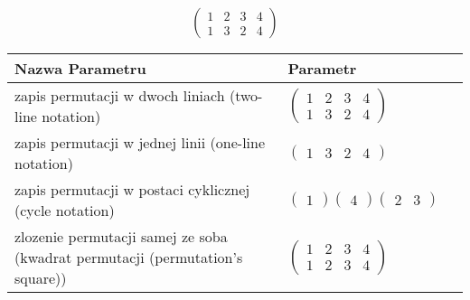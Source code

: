 \documentclass[12pt]{article}
\begin{document}
\subsection{}
\begin{center}
\[
\begin{pmatrix}
	1 & 2 & 3 & 4 \\ 
	1 & 3 & 2 & 4 
\end{pmatrix}
\]

\begin{tabular}{|m{0.6\linewidth}|m{0.4\linewidth}|}
	\hline
	Nazwa Parametru & Parametr \\
	\hline
	zapis permutacji w dwoch liniach (two-line notation) & $\begin{pmatrix} 1 & 2 & 3 & 4 \\ 
1 & 3 & 2 & 4 \end{pmatrix}$ \\ 
	\hline
	zapis permutacji w jednej linii (one-line notation) & $\begin{pmatrix} 1 & 3 & 2 & 4 \end{pmatrix}$ \\ 
	\hline
	zapis permutacji w postaci cyklicznej (cycle notation) & $\begin{pmatrix} 1 \end{pmatrix} \begin{pmatrix} 4 \end{pmatrix} \begin{pmatrix} 2 & 3 \end{pmatrix} $ \\ 
	\hline
	zlozenie permutacji samej ze soba (kwadrat permutacji (permutation's square)) & $\begin{pmatrix} 1 & 2 & 3 & 4 \\ 
1 & 2 & 3 & 4 \end{pmatrix}$ \\ 
	\hline
\end{tabular}
\end{center}
\end{document}
